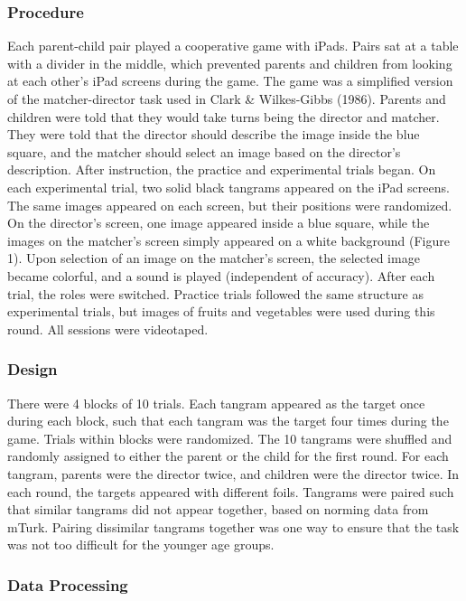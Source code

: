 \documentclass[10pt, letterpaper]{article}
\begin{document}
\hypertarget{procedure}{%
\subsubsection{Procedure}\label{procedure}}

Each parent-child pair played a cooperative game with iPads. Pairs sat
at a table with a divider in the middle, which prevented parents and
children from looking at each other's iPad screens during the game. The
game was a simplified version of the matcher-director task used in Clark
\& Wilkes-Gibbs (1986). Parents and children were told that they would
take turns being the director and matcher. They were told that the
director should describe the image inside the blue square, and the
matcher should select an image based on the director's description.
After instruction, the practice and experimental trials began. On each
experimental trial, two solid black tangrams appeared on the iPad
screens. The same images appeared on each screen, but their positions
were randomized. On the director's screen, one image appeared inside a
blue square, while the images on the matcher's screen simply appeared on
a white background (Figure 1). Upon selection of an image on the
matcher's screen, the selected image became colorful, and a sound is
played (independent of accuracy). After each trial, the roles were
switched. Practice trials followed the same structure as experimental
trials, but images of fruits and vegetables were used during this round.
All sessions were videotaped.

\hypertarget{design}{%
\subsubsection{Design}\label{design}}

There were 4 blocks of 10 trials. Each tangram appeared as the target
once during each block, such that each tangram was the target four times
during the game. Trials within blocks were randomized. The 10 tangrams
were shuffled and randomly assigned to either the parent or the child
for the first round. For each tangram, parents were the director twice,
and children were the director twice. In each round, the targets
appeared with different foils. Tangrams were paired such that similar
tangrams did not appear together, based on norming data from mTurk.
Pairing dissimilar tangrams together was one way to ensure that the task
was not too difficult for the younger age groups.

\hypertarget{data-processing}{%
\subsubsection{Data Processing}\label{data-processing}}
\end{document}
